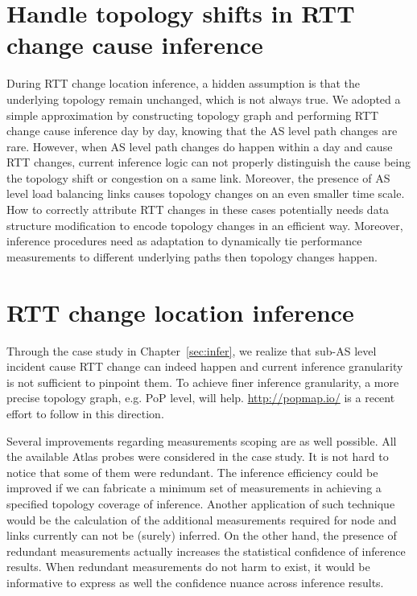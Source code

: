 \section{Handle topology shifts in RTT change cause inference} 
During RTT change location inference, a hidden assumption is that the underlying topology remain unchanged, which is not always true. We adopted a simple approximation by constructing topology graph and performing RTT change cause inference day by day, knowing that the AS level path changes are rare. 
However, when AS level path changes do happen within a day and cause RTT changes, current inference logic can not properly distinguish the cause being the topology shift or congestion on a same link.
Moreover, the presence of AS level load balancing links causes topology changes on an even smaller time scale. 
How to correctly attribute RTT changes in these cases potentially needs data structure modification to encode topology changes in an efficient way.
Moreover, inference procedures need as adaptation to dynamically tie performance measurements to different underlying paths then topology changes happen.

\section{RTT change location inference}
Through the case study in Chapter~\ref{sec:infer}, we realize that sub-AS level incident cause RTT change can indeed happen and current inference granularity is not sufficient to pinpoint them.
To achieve finer inference granularity, a more precise topology graph, e.g. \ac{PoP} level, will help. \url{http://popmap.io/} is a recent effort to follow in this direction.

Several improvements regarding measurements scoping are as well possible. All the available Atlas probes were considered in the case study. It is not hard to notice that some of them were redundant.
The inference efficiency could be improved if we can fabricate a minimum set of measurements in achieving a specified topology coverage of inference.
Another application of such technique would be the calculation of the additional measurements required for node and links currently can not be (surely) inferred.
On the other hand, the presence of redundant measurements actually increases the statistical confidence of inference results. When redundant measurements do not harm to exist, it would be informative to express as well the confidence nuance across inference results.

